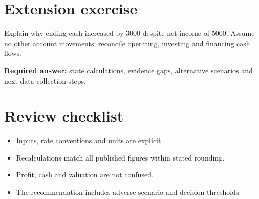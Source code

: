 \documentclass[11pt]{article}
\begin{document}
\section{Extension exercise}
Explain why ending cash increased by 3000 despite net income of 5000. Assume no other account movements; reconcile operating, investing and financing cash flows.\par\textbf{Required answer:} state calculations, evidence gaps, alternative scenarios and next data-collection steps.
\section{Review checklist}
\begin{itemize}[leftmargin=*,itemsep=3pt]
\item Inputs, rate conventions and units are explicit.
\item Recalculations match all published figures within stated rounding.
\item Profit, cash and valuation are not confused.
\item The recommendation includes adverse-scenario and decision thresholds.
\end{itemize}
\end{document}
